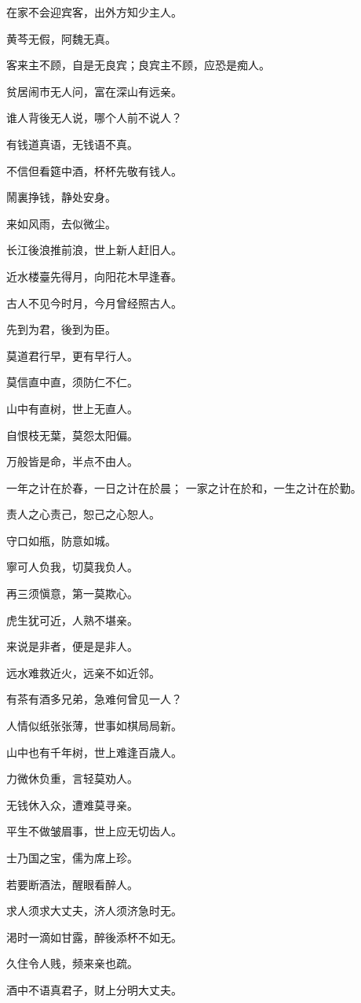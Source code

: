 \documentclass[12pt,oneside]{book}
\begin{document}
在家不会迎宾客，出外方知少主人。

黄芩无假，阿魏无真。

客来主不顾，自是无良宾；良宾主不顾，应恐是痴人。

贫居闹市无人问，富在深山有远亲。

谁人背後无人说，哪个人前不说人？

有钱道真语，无钱语不真。

不信但看筵中酒，杯杯先敬有钱人。

鬧裏挣钱，静处安身。

来如风雨，去似微尘。

长江後浪推前浪，世上新人赶旧人。

近水楼臺先得月，向阳花木早逢春。

古人不见今时月，今月曾经照古人。

先到为君，後到为臣。

莫道君行早，更有早行人。

莫信直中直，须防仁不仁。

山中有直树，世上无直人。

自恨枝无葉，莫怨太阳偏。

万般皆是命，半点不由人。

一年之计在於春，一日之计在於晨；
一家之计在於和，一生之计在於勤。

责人之心责己，恕己之心恕人。

守口如甁，防意如城。

寧可人负我，切莫我负人。

再三须愼意，第一莫欺心。

虎生犹可近，人熟不堪亲。

来说是非者，便是是非人。

远水难救近火，远亲不如近邻。

有茶有酒多兄弟，急难何曾见一人？

人情似纸张张薄，世事如棋局局新。

山中也有千年树，世上难逢百歳人。

力微休负重，言轻莫劝人。

无钱休入众，遭难莫寻亲。

平生不做皱眉事，世上应无切齿人。

士乃国之宝，儒为席上珍。

若要断酒法，醒眼看醉人。

求人须求大丈夫，济人须济急时无。

渇时一滴如甘露，醉後添杯不如无。

久住令人贱，频来亲也疏。

酒中不语真君子，财上分明大丈夫。
\end{document}
